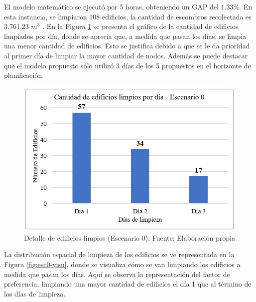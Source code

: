 \documentclass[12pt,a4paper]{article}
\begin{document}


El modelo matemático se ejecutó por 5 horas, obteniendo un GAP del $1.33\%$. En esta instancia, se limpiaron 108 edificios, la cantidad de escombros recolectada es 3.761,23 $m^{3}$ .
En la Figura \ref{fig:esc0-graf} se presenta el gráfico de la cantidad de edificios limpiados por día, donde se aprecia que, a medida que pasan los días, se limpia una menor cantidad de edificios. Esto se justifica debido a que se le da prioridad al primer día de limpiar la mayor cantidad de nodos. Además se puede destacar que el modelo propuesto sólo utilizó 3 días de los 5 propuestos en el horizonte de planificación.



\begin{figure}[h!]
\centering
\includegraphics[scale=0.8]{Figuras/INDIC1.jpg} 
\caption{Detalle de edificios limpios (Escenario 0), Fuente: Elaboración propia}
\label{fig:esc0-graf}
\end{figure}


La distribución espacial de limpieza de los edificios se ve representada en la Figura \ref{fig:esc0-visu}, donde se visualiza cómo se van limpiando los edificios a medida que pasan los días. Aquí se observa la representación del factor de preferencia, limpiando una mayor cantidad de edificios el día 1 que al término de los días de limpieza.
\end{document}
